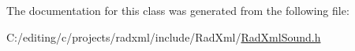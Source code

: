 The documentation for this class was generated from the following file\-:\begin{DoxyCompactItemize}
\item 
C\-:/editing/c/projects/radxml/include/\-Rad\-Xml/\hyperlink{_rad_xml_sound_8h}{Rad\-Xml\-Sound.\-h}\end{DoxyCompactItemize}

